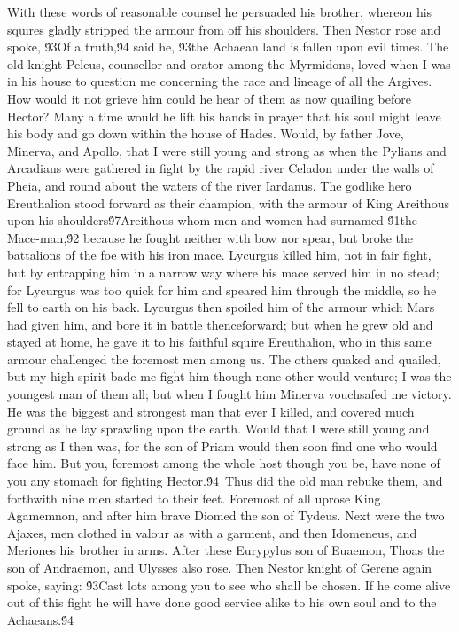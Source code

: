 {With these words of reasonable counsel he persuaded his brother, whereon his squires gladly stripped the armour from off his shoulders. Then Nestor rose and spoke, \'93Of a truth,\'94 said he, \'93the Achaean land is fallen upon evil times. The old knight Peleus, counsellor and orator among the Myrmidons, loved when I was in his house to question me concerning the race and lineage of all the Argives. How would it not grieve him could he hear of them as now quailing before Hector? Many a time would he lift his hands in prayer that his soul might leave his body and go down within the house of Hades. Would, by father Jove, Minerva, and Apollo, that I were still young and strong as when the Pylians and Arcadians were gathered in fight by the rapid river Celadon under the walls of Pheia, and round about the waters of the river Iardanus. The godlike hero Ereuthalion stood forward as their champion, with the armour of King Areithous upon his shoulders\'97Areithous whom men and women had surnamed \'91the Mace-man,\'92 because he fought neither with bow nor spear, but broke the battalions of the foe with his iron mace. Lycurgus killed him, not in fair fight, but by entrapping him in a narrow way where his mace served him in no stead; for Lycurgus was too quick for him and speared him through the middle, so he fell to earth on his back. Lycurgus then spoiled him of the armour which Mars had given him, and bore it in battle thenceforward; but when he grew old and stayed at home, he gave it to his faithful squire Ereuthalion, who in this same armour challenged the foremost men among us. The others quaked and quailed, but my high spirit bade me fight him though none other would venture; I was the youngest man of them all; but when I fought him Minerva vouchsafed me victory. He was the biggest and strongest man that ever I killed, and covered much ground as he lay sprawling upon the earth. Would that I were still young and strong as I then was, for the son of Priam would then soon find one who would face him. But you, foremost among the whole host though you be, have none of you any stomach for fighting Hector.\'94\
Thus did the old man rebuke them, and forthwith nine men started to their feet. Foremost of all uprose King Agamemnon, and after him brave Diomed the son of Tydeus. Next were the two Ajaxes, men clothed in valour as with a garment, and then Idomeneus, and Meriones his brother in arms. After these Eurypylus son of Euaemon, Thoas the son of Andraemon, and Ulysses also rose. Then Nestor knight of Gerene again spoke, saying: \'93Cast lots among you to see who shall be chosen. If he come alive out of this fight he will have done good service alike to his own soul and to the Achaeans.\'94\
}
